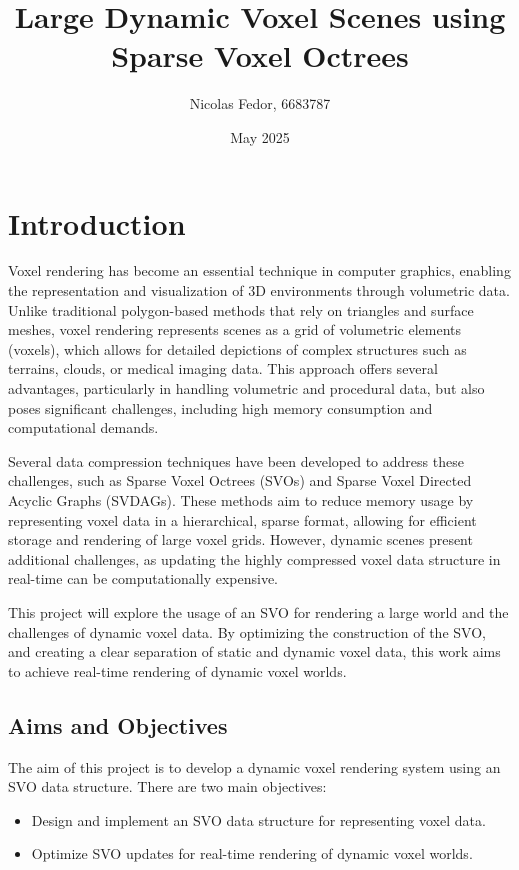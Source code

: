 \documentclass{article}
\title{Large Dynamic Voxel Scenes using Sparse Voxel Octrees}
\author{Nicolas Fedor, 6683787}
\date{May 2025}
\begin{document}
\maketitle

\section{Introduction}
Voxel rendering has become an essential technique in computer graphics, enabling the representation and visualization of 3D environments through volumetric data. Unlike traditional polygon-based methods that rely on triangles and surface meshes, voxel rendering represents scenes as a grid of volumetric elements (voxels), which allows for detailed depictions of complex structures such as terrains, clouds, or medical imaging data. This approach offers several advantages, particularly in handling volumetric and procedural data, but also poses significant challenges, including high memory consumption and computational demands.

Several data compression techniques have been developed to address these challenges, such as Sparse Voxel Octrees (SVOs) and Sparse Voxel Directed Acyclic Graphs (SVDAGs). These methods aim to reduce memory usage by representing voxel data in a hierarchical, sparse format, allowing for efficient storage and rendering of large voxel grids. However, dynamic scenes present additional challenges, as updating the highly compressed voxel data structure in real-time can be computationally expensive.

This project will explore the usage of an SVO for rendering a large world and the challenges of dynamic voxel data. By optimizing the construction of the SVO, and creating a clear separation of static and dynamic voxel data, this work aims to achieve real-time rendering of dynamic voxel worlds.

\subsection{Aims and Objectives}
The aim of this project is to develop a dynamic voxel rendering system using an SVO data structure. There are two main objectives:

\begin{itemize}
    \item Design and implement an SVO data structure for representing voxel data.
    \item Optimize SVO updates for real-time rendering of dynamic voxel worlds.
\end{itemize}
\end{document}
